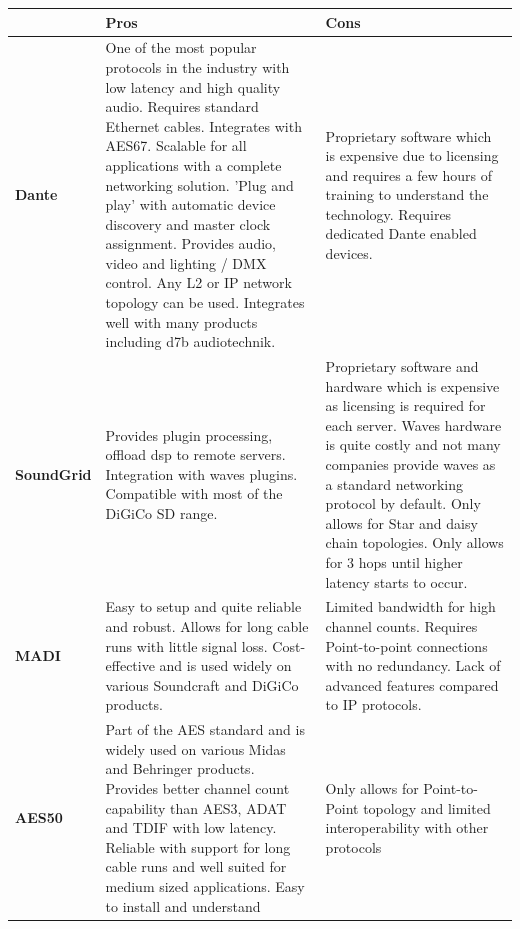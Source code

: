             \begin{longtable}[H]{|p{2cm}|
                >{\columncolor[HTML]{9AFF99}}p{6.8cm} |
                >{\columncolor[HTML]{FFCCC9}}p{6.8cm} |}
                \hline
                 &
                  \textbf{Pros} &
                  \textbf{Cons} \\ \hline
                \endfirsthead
                \endhead
                \textbf{Dante} &
                  One of the most popular protocols in the industry with low latency and high quality audio. Requires standard Ethernet cables. Integrates with AES67. Scalable for all applications with a complete networking solution. 'Plug and play' with automatic device discovery and master clock assignment. Provides audio, video and lighting / DMX control. Any L2 or IP network topology can be used. Integrates well with many products including d7b audiotechnik. &
                  Proprietary software which is expensive due to licensing and requires a few hours of training to understand the technology. Requires dedicated Dante enabled devices. \\ \hline
                \textbf{SoundGrid} &
                  Provides plugin processing, offload \gls{dsp} to remote servers. Integration with waves plugins. Compatible with most of the DiGiCo SD range. &
                  Proprietary software and hardware which is expensive as licensing is required for each server. Waves hardware is quite costly and not many companies provide waves as a standard networking protocol by default. Only allows for Star and daisy chain topologies. Only allows for 3 hops until higher latency starts to occur. \\ \hline
                \textbf{MADI} &
                  Easy to setup and quite reliable and robust. Allows for long cable runs with little signal loss. Cost-effective and is used widely on various Soundcraft and DiGiCo products. &
                  Limited bandwidth for high channel counts. Requires Point-to-point connections with no redundancy. Lack of advanced features compared to IP protocols. \\ \hline
                \textbf{AES50} &
                  Part of the AES standard and is widely used on various Midas and Behringer products. Provides better channel count capability than AES3, ADAT and TDIF with low latency. Reliable with support for long cable runs and well suited for medium sized applications. Easy to install and understand &
                  Only allows for Point-to-Point topology and limited interoperability with other protocols \\ \hline

\end{longtable}

